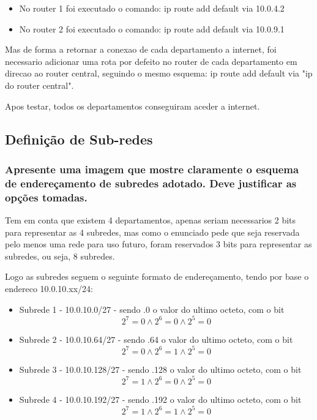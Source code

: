 \documentclass{article}
\begin{document}
\begin{itemize}
    \item No router 1 foi executado o comando: ip route add default via 10.0.4.2
    \item No router 2 foi executado o comando: ip route add default via 10.0.9.1
\end{itemize}

Mas de forma a retornar a conexao de cada departamento a internet, foi necessario adicionar uma rota por defeito no router de cada departamento em direcao ao router central, seguindo o mesmo esquema: ip route add default via "ip do router central".

Apos testar, todos os departamentos conseguiram aceder a internet.

\subsection{Definição de Sub-redes}
\subsubsection{Apresente uma imagem que mostre claramente o esquema de
endereçamento de subredes adotado. Deve justificar as opções tomadas.}

Tem em conta que existem 4 departamentos, apenas seriam necessarios 2 bits para representar as 4 subredes, mas como o enunciado pede que seja reservada pelo menos uma rede para uso futuro, foram reservados 3 bits para representar as subredes, ou seja, 8 subredes.

Logo as subredes seguem o seguinte formato de endereçamento, tendo por base o endereco 10.0.10.xx/24:
\begin{itemize}
    \item Subrede 1 - 10.0.10.0/27 - sendo .0 o valor do ultimo octeto, com o bit \[2^7 = 0 \land 2^6 = 0 \land 2^5 = 0\]
    \item Subrede 2 - 10.0.10.64/27 - sendo .64 o valor do ultimo octeto, com o bit \[2^7 = 0 \land 2^6 = 1 \land 2^5 = 0\]
    \item Subrede 3 - 10.0.10.128/27 - sendo .128 o valor do ultimo octeto, com o bit \[2^7 = 1 \land 2^6 = 0 \land 2^5 = 0\]
    \item Subrede 4 - 10.0.10.192/27 - sendo .192 o valor do ultimo octeto, com o bit \[2^7 = 1 \land 2^6 = 1 \land 2^5 = 0\]
\end{itemize}
\end{document}

